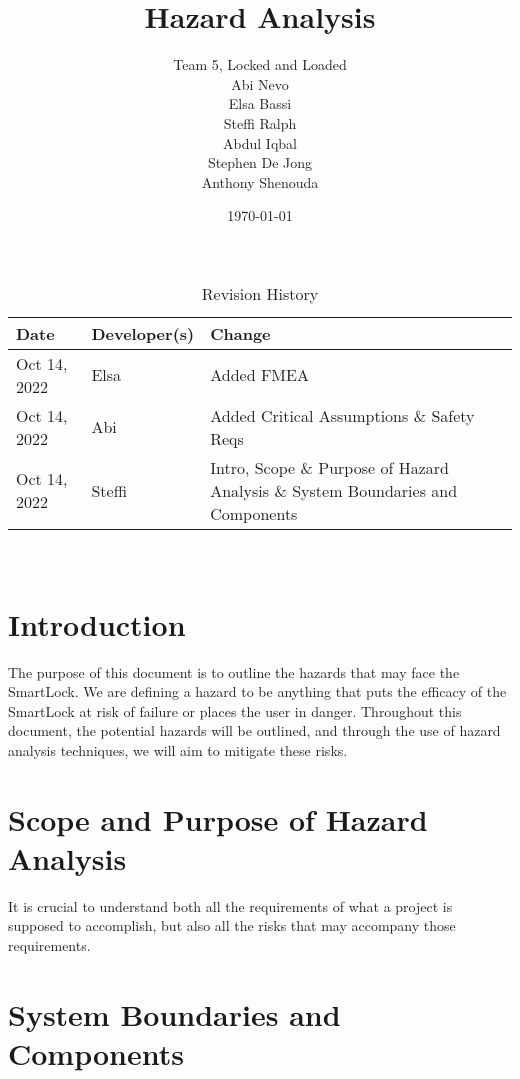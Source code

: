 \documentclass{article}
\title{Hazard Analysis\\\progname}
\author{Team 5, Locked and Loaded
		\\ Abi Nevo\\Elsa Bassi\\Steffi Ralph\\Abdul Iqbal\\Stephen De Jong\\Anthony Shenouda
}
\date{\today}
\begin{document}

\begin{table}[hp]
\caption{Revision History} \label{TblRevisionHistory}
\begin{tabularx}{\textwidth}{llX}
\toprule
\textbf{Date} & \textbf{Developer(s)} & \textbf{Change}\\
\midrule
Oct 14, 2022 & Elsa & Added FMEA\\
Oct 14, 2022 & Abi & Added Critical Assumptions \& Safety Reqs\\
Oct 14, 2022 & Steffi & Intro, Scope \& Purpose of Hazard Analysis \& System Boundaries and Components\\
\bottomrule
\end{tabularx}
\end{table}

\newpage

\maketitle

\newpage


\tableofcontents

~\newpage

\section{Introduction}
The purpose of this document is to outline the hazards that may face the SmartLock. We are defining a hazard to be anything that puts the efficacy of the SmartLock at risk of failure or places the user in danger. 
Throughout this document, the potential hazards will be outlined, and through the use of hazard analysis techniques, we will aim to mitigate these risks. 


\section{Scope and Purpose of Hazard Analysis}

It is crucial to understand both all the requirements of what a project is supposed to accomplish, but also all the risks that may accompany those requirements.

\section{System Boundaries and Components}
\end{document}
